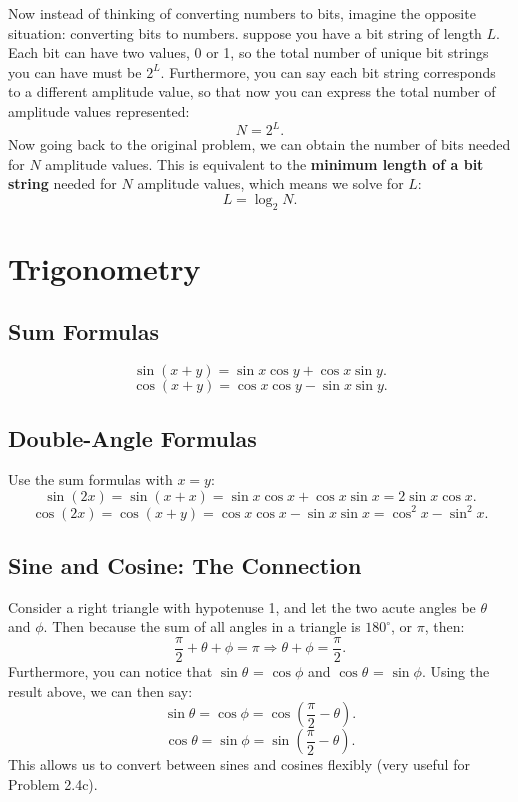 \documentclass[11pt]{article}
\begin{document}
Now instead of thinking of converting numbers to bits, imagine the opposite situation: converting bits to numbers. suppose you have a bit string of length $L$. Each bit can have two values, 0 or 1, so the total number of unique bit strings you can have must be $2^L$. Furthermore, you can say each bit string corresponds to a different amplitude value, so that now you can express the total number of amplitude values represented:
\[N=2^L.\]
Now going back to the original problem, we can obtain the number of bits needed for $N$ amplitude values. This is equivalent to the {\bf minimum length of a bit string} needed for $N$ amplitude values, which means we solve for $L$:
\[L = \log_2{N}.\]

\section{Trigonometry}

\subsection{Sum Formulas}

\[ \sin{(x+y)} = \sin{x}\cos{y} + \cos{x}\sin{y}. \]
\[ \cos{(x+y)} = \cos{x}\cos{y} - \sin{x}\sin{y}. \]

\subsection{Double-Angle Formulas}
Use the sum formulas with $x=y$:
\[ \sin{(2x)} = \sin{(x+x)} = \sin{x}\cos{x} + \cos{x}\sin{x} = 2\sin{x}\cos{x}. \]
\[ \cos{(2x)} = \cos{(x+y)} = \cos{x}\cos{x} - \sin{x}\sin{x} =  \cos^2{x} - \sin^2{x}. \]

\subsection{Sine and Cosine: The Connection}
Consider a right triangle with hypotenuse 1, and let the two acute angles be $\theta$ and $\phi$. Then because the sum of all angles in a triangle is $180^\circ$, or $\pi$, then:
\[ \frac{\pi}{2} + \theta + \phi = \pi \Longrightarrow \theta + \phi = \frac{\pi}{2}.\]
Furthermore, you can notice that $\sin{\theta}$ = $\cos{\phi}$ and $\cos{\theta}$ = $\sin{\phi}$. Using the result above, we can then say:
\[ \sin{\theta} = \cos{\phi} = \cos{\left( \frac{\pi}{2} - \theta \right)}.\]
\[ \cos{\theta} = \sin{\phi} = \sin{\left( \frac{\pi}{2} - \theta \right)}.\]
This allows us to convert between sines and cosines flexibly (very useful for Problem 2.4c).
\end{document}

